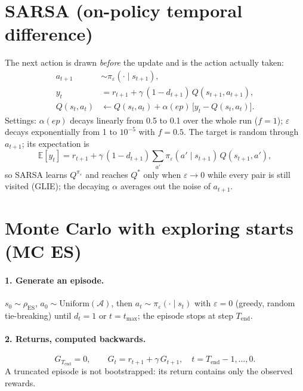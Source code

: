 \documentclass[11pt]{article}
\newcommand{\Aset}{\mathcal{A}}
\newcommand{\Qs}{Q^{*}}
\newcommand{\eps}{\varepsilon}
\begin{document}
\section{SARSA (on-policy temporal difference)}
The next action is drawn \emph{before} the update and is the action actually taken:
\begin{align}
a_{t+1} &\sim \pi_{\eps}(\cdot\mid s_{t+1}),\\
y_t &= r_{t+1}+\gamma\,(1-d_{t+1})\,Q(s_{t+1},a_{t+1}),\\
Q(s_t,a_t) &\leftarrow Q(s_t,a_t)+\alpha(ep)\,\big[y_t-Q(s_t,a_t)\big].
\end{align}
Settings: $\alpha(ep)$ decays linearly from 0.5 to 0.1 over the whole run ($f=1$); $\eps$ decays exponentially from 1 to $10^{-5}$ with $f=0.5$. The target is random through $a_{t+1}$; its expectation is
\begin{equation}
\mathbb{E}[y_t]=r_{t+1}+\gamma\,(1-d_{t+1})\sum_{a'}\pi_{\eps}(a'\mid s_{t+1})\,Q(s_{t+1},a'),
\end{equation}
so SARSA learns $Q^{\pi_\eps}$ and reaches $\Qs$ only when $\eps\to0$ while every pair is still visited (GLIE); the decaying $\alpha$ averages out the noise of $a_{t+1}$.

\section{Monte Carlo with exploring starts (MC ES)}
\paragraph{1. Generate an episode.} $s_0\sim\rho_{\mathrm{ES}}$, $a_0\sim\mathrm{Uniform}(\Aset)$, then $a_t\sim\pi_{\eps}(\cdot\mid s_t)$ with $\eps=0$ (greedy, random tie-breaking) until $d_{t}=1$ or $t=t_{\max}$; the episode stops at step $T_{\mathrm{end}}$.

\paragraph{2. Returns, computed backwards.}
\begin{equation}
G_{T_{\mathrm{end}}}=0,\qquad G_t=r_{t+1}+\gamma\,G_{t+1},\quad t=T_{\mathrm{end}}-1,\dots,0 .
\end{equation}
A truncated episode is not bootstrapped: its return contains only the observed rewards.
\end{document}
